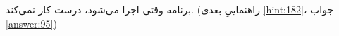 \section{}
\paragraph{}\label{hint:73}
برنامه وقتی اجرا می‌شود، درست کار نمی‌کند. (راهنماییِ بعدی \ref{hint:182}، جواب \ref{answer:95})